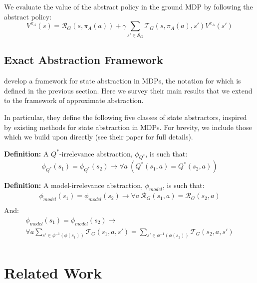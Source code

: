 \documentclass{article}
\newcommand\defn[1]{{\bf Definition:} #1}
\begin{document}
We evaluate the value of the abstract policy in the ground MDP by following the abstract policy:
\begin{equation}
V^{\pi_A}(s) = \mathcal{R}_G(s,\pi_A(a)) + \gamma \sum_{s' \in \mathcal{S}_G} \mathcal{T}_G(s,\pi_A(a),s')V^{\pi_A}(s')
\end{equation}

\subsection{Exact Abstraction Framework}

\citep{li2006towards} develop a framework for state abstraction in \acp{MDP}, the notation for which is defined in the previous section. Here we survey their main results that we extend to the framework of approximate abstraction.

In particular, they define the following five classes of state abstractors, inspired by existing methods for state abstraction in \acp{MDP}. For brevity, we include those which we build upon directly (see their paper for full details).

\defn{A $Q^*$-irrelevance abstraction, $\phi_{Q^*}$, is such that:
\begin{equation}
\phi_{Q^*}(s_1) = \phi_{Q^*}(s_2) \longrightarrow \forall a\ \left(Q^*(s_1,a) = Q^*(s_2,a)\right)
\end{equation}
}

\defn{A model-irrelevance abstraction, $\phi_{model}$, is such that:
\begin{multline}
\phi_{model}(s_1) = \phi_{model}(s_2) \rightarrow \forall a\ \mathcal{R}_G(s_1,a) = \mathcal{R}_G(s_2,a) \\
\end{multline}
And:
\begin{multline}
\phi_{model}(s_1) = \phi_{model}(s_2) \rightarrow \\ \forall a \sum_{s' \in \phi^{-1}(\phi(s_1))} \mathcal{T}_G(s_1,a,s') =\sum_{s' \in \phi^{-1}(\phi(s_2))} \mathcal{T}_G(s_2,a,s') \\
\end{multline}
}


\section{Related Work}
\end{document}
